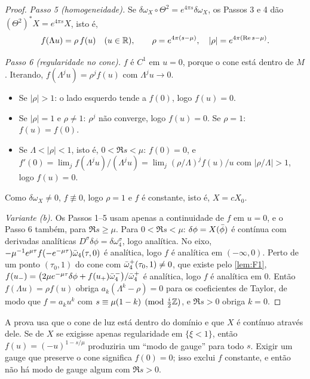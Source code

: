 \begin{proof}
\emph{Passo 5 (homogeneidade).} Se $\delta\omega_X\circ\Theta^2=e^{4\pi s}\delta\omega_X$, os Passos 3 e 4 dão
$(\Theta^2)^*X=e^{4\pi s}X$, isto é,
\[
  f(\Lambda u)=\rho\,f(u)\quad(u\in\mathbb{R}),\qquad \rho=e^{4\pi(s-\mu)},\quad |\rho|=e^{4\pi(\operatorname{Re} s-\mu)}.
\]

\emph{Passo 6 (regularidade no cone).} $f$ é $C^1$ em $u=0$, porque o cone está dentro de $M$. Iterando,
$f(\Lambda^ju)=\rho^jf(u)$ com $\Lambda^ju\to0$.
\begin{itemize}[leftmargin=*]
\item Se $|\rho|>1$: o lado esquerdo tende a $f(0)$, logo $f(u)=0$.
\item Se $|\rho|=1$ e $\rho\neq1$: $\rho^j$ não converge, logo $f(u)=0$. Se $\rho=1$: $f(u)=f(0)$.
\item Se $\Lambda<|\rho|<1$, isto é, $0<\Re s<\mu$: $f(0)=0$, e
  $f'(0)=\lim_jf(\Lambda^ju)/(\Lambda^ju)=\lim_j(\rho/\Lambda)^jf(u)/u$ com $|\rho/\Lambda|>1$, logo $f(u)=0$.
\end{itemize}
Como $\delta\omega_X\neq0$, $f\not\equiv0$, logo $\rho=1$ e $f$ é constante, isto é, $X=cX_0$.

\emph{Variante (b).} Os Passos 1--5 usam apenas a continuidade de $f$ em $u=0$, e o Passo 6 também, para $\Re s\ge\mu$.
Para $0<\Re s<\mu$: $\delta\phi=X(\bar\phi)$ é contínua com derivadas analíticas
$D^\sigma\delta\phi=\delta\omega_4^\sigma$, logo analítica. No eixo,
$-\mu^{-1}e^{\mu\tau}f(-e^{-\mu\tau})\bar\omega_4(\tau,0)$ é analítica, logo $f$ é analítica em $(-\infty,0)$.
Perto de um ponto $(\tau_0,1)$ do cone com $\bar\omega_4^+(\tau_0,1)\neq0$, que existe pelo \cref{lem:F1},
$f(u_-)=\big(2\mu e^{-\mu\tau}\delta\phi+f(u_+)\bar\omega_4^-\big)/\bar\omega_4^+$ é analítica, logo $f$ é analítica
em $0$. Então $f(\Lambda u)=\rho f(u)$ obriga $a_k(\Lambda^k-\rho)=0$ para os coeficientes de Taylor, de modo que
$f=a_ku^k$ com $s\equiv\mu(1-k)\pmod{\tfrac i2\mathbb{Z}}$, e $\Re s>0$ obriga $k=0$.
\end{proof}

\begin{remark}\label{rem:cone-role}
A prova usa que o cone de luz está dentro do domínio e que $X$ é contínuo através dele. Se de $X$ se exigisse
apenas regularidade em $\{\xi<1\}$, então $f(u)=(-u)^{1-s/\mu}$ produziria um ``modo de gauge'' para
todo $s$. Exigir um gauge que preserve o cone significa $f(0)=0$; isso exclui $f$ constante, e então não há
modo de gauge algum com $\Re s>0$.
\end{remark}

